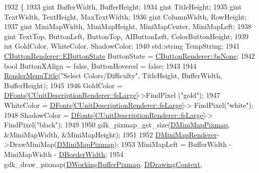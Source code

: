 \begin{DoxyCode}
1932                                                \{
1933     gint BufferWidth, BufferHeight;
1934     gint TitleHeight;
1935     gint TextWidth, TextHeight, MaxTextWidth;
1936     gint ColumnWidth, RowHeight;
1937     gint MiniMapWidth, MiniMapHeight, MiniMapCenter, MiniMapLeft;
1938     gint TextTop, ButtonLeft, ButtonTop, AIButtonLeft, ColorButtonHeight;
1939     \textcolor{keywordtype}{int} GoldColor, WhiteColor, ShadowColor;
1940     std::string TempString;
1941     \hyperlink{classCButtonRenderer_ae0eccda184600f6e14bfd59033e5e9a1}{CButtonRenderer::EButtonState} ButtonState = 
      \hyperlink{classCButtonRenderer_ae0eccda184600f6e14bfd59033e5e9a1aa0cd7277705307bef6c50f2250b5d62d}{CButtonRenderer::bsNone};
1942     \textcolor{keywordtype}{bool} ButtonXAlign = \textcolor{keyword}{false}, ButtonHovered = \textcolor{keyword}{false};
1943     
1944     \hyperlink{classCApplicationData_a548c5924a281c7e226fd7cac44e59920}{RenderMenuTitle}(\textcolor{stringliteral}{"Select Colors/Difficulty"}, TitleHeight, BufferWidth, BufferHeight); 
1945     
1946     GoldColor = \hyperlink{classCApplicationData_afde9247d0a3ea87393ec86dcdb1e8274}{DFonts}[\hyperlink{classCUnitDescriptionRenderer_a3ea4cd83b6dd9533ab3abb953a7da35aaf467097fe4f4811a5e2f1959c86e071d}{CUnitDescriptionRenderer::fsLarge}]->FindPixel
      (\textcolor{stringliteral}{"gold"});
1947     WhiteColor = \hyperlink{classCApplicationData_afde9247d0a3ea87393ec86dcdb1e8274}{DFonts}[\hyperlink{classCUnitDescriptionRenderer_a3ea4cd83b6dd9533ab3abb953a7da35aaf467097fe4f4811a5e2f1959c86e071d}{CUnitDescriptionRenderer::fsLarge}]->
      FindPixel(\textcolor{stringliteral}{"white"});
1948     ShadowColor = \hyperlink{classCApplicationData_afde9247d0a3ea87393ec86dcdb1e8274}{DFonts}[\hyperlink{classCUnitDescriptionRenderer_a3ea4cd83b6dd9533ab3abb953a7da35aaf467097fe4f4811a5e2f1959c86e071d}{CUnitDescriptionRenderer::fsLarge}]->
      FindPixel(\textcolor{stringliteral}{"black"});
1949     
1950     gdk\_pixmap\_get\_size(\hyperlink{classCApplicationData_abe3af81659ead5113b7b2f165a88e737}{DMiniMapPixmap}, &MiniMapWidth, &MiniMapHeight); 
1951     
1952     \hyperlink{classCApplicationData_a59b0f5dfe30ed5a54dd28aee98109e34}{DMiniMapRenderer}->DrawMiniMap(\hyperlink{classCApplicationData_abe3af81659ead5113b7b2f165a88e737}{DMiniMapPixmap});
1953     MiniMapLeft = BufferWidth - MiniMapWidth - \hyperlink{classCApplicationData_a566b69c72fa982c6ecf8e47dc21df489}{DBorderWidth};
1954     gdk\_draw\_pixmap(\hyperlink{classCApplicationData_afa34cf2780f38dd28c0c811e69d60a97}{DWorkingBufferPixmap}, \hyperlink{classCApplicationData_aa6c5bea9bdcc64398e5a3f693661d37c}{DDrawingContext}, 

\end{DoxyCode}
